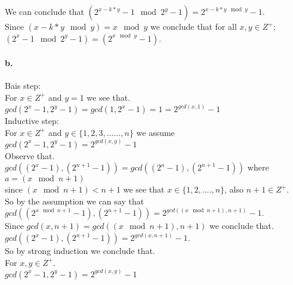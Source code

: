 \documentclass[11pt]{article}
\begin{document}
We can conclude that $(2^{x-k*y} - 1 \mod 2^y - 1) = 2^{x-k*y \mod y} - 1$.\\

Since $(x -k*y \mod y) = x \mod y$ we conclude that for all $x,y \in Z^+$; $(2^x - 1 \mod 2^y - 1) = (2^{x \mod y} - 1)$.\\

\paragraph{b.}
 
Bais step:\\

    For $x \in Z^+$ and $y = 1$ we see that.\\
    
    $gcd(2^x -1, 2^y -1) = gcd(1, 2^x -1) = 1 = 2^{gcd(x,1)} - 1$\\
    
Inductive step: \\

    For $x \in Z^+$ and $y \in \{1,2,3,......,n\}$ we assume $gcd(2^x -1, 2^y -1) = 2^{gcd(x,y)} -1$\\
    
    Observe that.\\
    
    $gcd((2^x -1), (2^{n+1} -1)) = gcd((2^a -1), (2^{n+1} - 1))$ where $a = (x \mod n+1)$\\
    
    since $(x \mod n+1) < n+1$ we see that $x\in \{1,2,....,n\}$, also $n+1 \in Z^+$.\\
    
    So by the assumption we can say that $gcd((2^{x \mod n+1} -1),(2^{n+1} - 1)) = 2^{gcd((x \mod n+1),n+1)} - 1$.\\
    
    Since $gcd(x,n+1) = gcd((x\mod n+1),n+1)$ we conclude that.\\
    
    $gcd((2^{x} -1),(2^{n+1} - 1)) = 2^{gcd(x ,n+1)} - 1$.\\
    
So by strong induction we conclude that.\\

For $x,y \in Z^+$.\\

$gcd(2^x -1, 2^y -1) = 2^{gcd(x,y)} -1$
\end{document}
